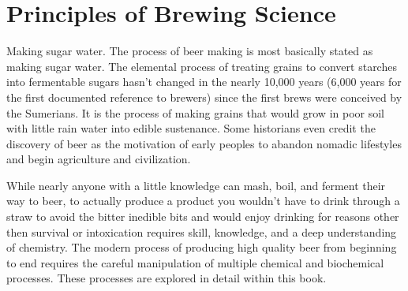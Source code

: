 %
%

\chapter{Principles of Brewing Science}
\label{chap:brewing}

Making sugar water. The process of beer making is most basically stated as
making sugar water.  The elemental process of treating grains to convert
starches into fermentable sugars hasn't changed in the nearly 10,000 years
(6,000 years for the first documented reference to brewers) since the first
brews were conceived by the Sumerians. It is the process of making grains that
would grow in poor soil with little rain water into edible sustenance. Some
historians even credit the discovery of beer as the motivation of early peoples
to abandon nomadic lifestyles and begin agriculture and civilization.

While nearly anyone with a little knowledge can mash, boil, and ferment their
way to beer, to actually produce a product you wouldn't have to drink
through a straw to avoid the bitter inedible bits and would enjoy drinking for
reasons other then survival or intoxication requires skill, knowledge, and a
deep understanding of chemistry. The modern process of producing high quality
beer from beginning to end requires the careful manipulation of multiple
chemical and biochemical processes. These processes are explored in detail
within this book.

